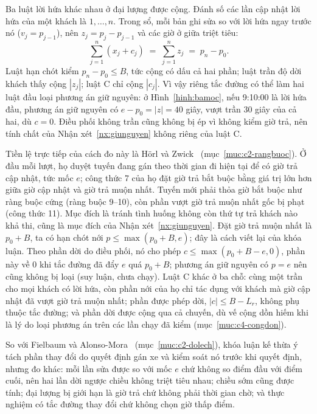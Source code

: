 Ba luật lời hứa khác nhau ở đại lượng được cộng. Đánh số các lần cập nhật lời hứa của một khách là
$1, \ldots, n$. Trong sổ, mỗi bản ghi sửa so với lời hứa ngay trước nó ($v_j = p_{j-1}$), nên
$z_j = p_j - p_{j-1}$ và các giờ ở giữa triệt tiêu:
\begin{equation}
\sum_{j=1}^{n} (x_j + c_j) \;=\; \sum_{j=1}^{n} z_j \;=\; p_n - p_0 .
\label{eq:dongnhat}
\end{equation}
Luật hạn chót kiểm $p_n - p_0 \le B$, tức cộng có dấu cả hai phần; luật trần độ dời khách thấy cộng $|z_j|$;
luật C chỉ cộng $|c_j|$. Vì vậy riêng tắc đường có thể làm hai luật đầu loại phương án giữ nguyên: ở
Hình~\ref{hinh:bamoc}, nếu 9:10:00 là lời hứa đầu, phương án giữ nguyên có $e - p_0 = |z| = 40$ giây, vượt trần
30 giây của cả hai, dù $c = 0$. Điều phối không trần cũng không bị ép vì không kiểm giờ trả, nên tính chất của
Nhận xét~\ref{nx:giunguyen} không riêng của luật C.

Tiền lệ trực tiếp của cách đo này là Hörl và Zwick~\cite{horl2022} (mục~\ref{muc:c2-rangbuoc}). Ở đầu mỗi
lượt, họ duyệt tuyến đang gán theo thời gian đi hiện tại để có giờ trả cập nhật, tức mốc $e$; công thức 7 của
họ đặt giờ trả bắt buộc bằng giá trị lớn hơn giữa giờ cập nhật và giờ trả muộn nhất. Tuyến mới phải thỏa giờ bắt
buộc như ràng buộc cứng (ràng buộc 9--10), còn phần vượt giờ trả muộn nhất gốc bị phạt (công thức 11). Mục đích
là tránh tình huống không còn thứ tự trả khách nào khả thi, cũng là mục đích của Nhận xét~\ref{nx:giunguyen}.
Đặt giờ trả muộn nhất là $p_0 + B$, ta có hạn chót nới $p \le \max(p_0 + B, e)$; đây là cách viết lại của khóa
luận. Theo phần dời do điều phối, nó cho phép $c \le \max(p_0 + B - e, 0)$, phần này về 0 khi tắc đường đã đẩy
$e$ quá $p_0 + B$; phương án giữ nguyên có $p = e$ nên cũng không bị loại (suy luận, chưa chạy). Luật C khác ở
ba chỗ: cùng một trần cho mọi khách có lời hứa, còn phần nới của họ chỉ tác dụng với khách mà giờ cập nhật đã
vượt giờ trả muộn nhất; phần được phép dời, $|c| \le B - L_r$, không phụ thuộc tắc đường; và phần dời được cộng
qua cả chuyến, dù vế cộng dồn hiếm khi là lý do loại phương án trên các lần chạy đã kiểm
(mục~\ref{muc:c4-congdon}).

So với Fielbaum và Alonso-Mora~\cite{fielbaum2020} (mục~\ref{muc:c2-dolech}), khóa luận kế thừa ý tách phần thay
đổi do quyết định gán xe và kiểm soát nó trước khi quyết định, nhưng đo khác: mỗi lần sửa được so với mốc $e$
chứ không so điểm đầu với điểm cuối, nên hai lần dời ngược chiều không triệt tiêu nhau; chiều sớm cũng được tính;
đại lượng bị giới hạn là giờ trả chứ không phải thời gian chờ; và thực nghiệm có tắc đường thay đổi chứ không
chọn giờ thấp điểm.

